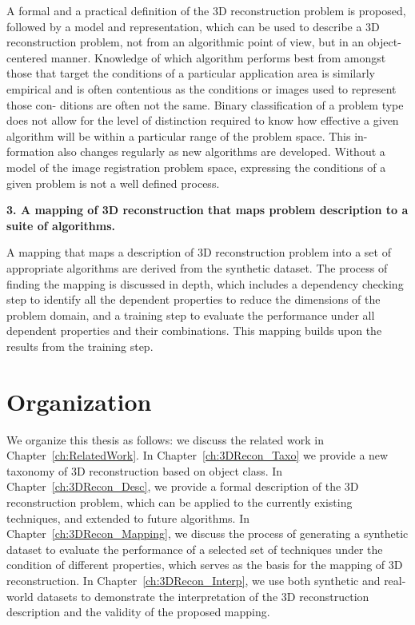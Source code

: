 A formal and a practical definition of the 3D reconstruction problem is proposed, followed by a model and representation, which can be used to describe a 3D reconstruction problem, not from an algorithmic point of view, but in an object-centered manner. Knowledge of which algorithm performs best from amongst those that target the conditions of a particular application area is similarly empirical and is often contentious as the conditions or images used to represent those con- ditions are often not the same. Binary classification of a problem type does not allow for the level of distinction required to know how effective a given algorithm will be within a particular range of the problem space. This in- formation also changes regularly as new algorithms are developed. Without a model of the image registration problem space, expressing the conditions of a given problem is not a well defined process.

\noindent\textbf{3. A mapping of 3D reconstruction that maps problem description to a suite of algorithms.}

A mapping that maps a description of 3D reconstruction problem into a set of appropriate algorithms are derived from the synthetic dataset. The process of finding the mapping is discussed in depth, which includes a dependency checking step to identify all the dependent properties to reduce the dimensions of the problem domain, and a training step to evaluate the performance under all dependent properties and their combinations. This mapping builds upon the results from the training step.

\section{Organization}
We organize this thesis as follows: we discuss the related work in Chapter~\ref{ch:RelatedWork}. In Chapter~\ref{ch:3DRecon_Taxo} we provide a new taxonomy of 3D reconstruction based on object class. In Chapter~\ref{ch:3DRecon_Desc}, we provide a formal description of the 3D reconstruction problem, which can be applied to the currently existing techniques, and extended to future algorithms. In Chapter~\ref{ch:3DRecon_Mapping}, we discuss the process of generating a synthetic dataset to evaluate the performance of a selected set of techniques under the condition of different properties, which serves as the basis for the mapping of 3D reconstruction. In Chapter~\ref{ch:3DRecon_Interp}, we use both synthetic and real-world datasets to demonstrate the interpretation of the 3D reconstruction description and the validity of the proposed mapping.